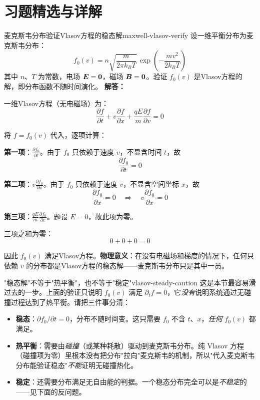 ﻿%

\section*{习题精选与详解}

\begin{example}{麦克斯韦分布验证Vlasov方程的稳态解}{maxwell-vlasov-verify}
设一维平衡分布为麦克斯韦分布：
\[
f_0(v) = n\sqrt{\frac{m}{2\pi k_{\!B}T}}\,\exp\!\left(-\frac{mv^2}{2k_{\!B}T}\right)
\]
其中 $n$、$T$ 为常数，电场 $\bm{E}=\bm{0}$，磁场 $\bm{B}=\bm{0}$。验证 $f_0(v)$ 是Vlasov方程的解，即分布函数不随时间演化。
\tcblower
\textbf{解答：}

一维Vlasov方程（无电磁场）为：
\[
\frac{\partial f}{\partial t} + v\frac{\partial f}{\partial x} + \frac{qE}{m}\frac{\partial f}{\partial v} = 0
\]

将 $f = f_0(v)$ 代入，逐项计算：

\textbf{第一项}：$\frac{\partial f_0}{\partial t}$。由于 $f_0$ 只依赖于速度 $v$，不显含时间 $t$，故
\[
\frac{\partial f_0}{\partial t} = 0
\]

\textbf{第二项}：$v\frac{\partial f_0}{\partial x}$。由于 $f_0$ 只依赖于速度 $v$，不显含空间坐标 $x$，故
\[
\frac{\partial f_0}{\partial x} = 0 \quad\Rightarrow\quad v\frac{\partial f_0}{\partial x} = 0
\]

\textbf{第三项}：$\frac{qE}{m}\frac{\partial f_0}{\partial v}$。题设 $E=0$，故此项为零。

三项之和为零：
\[
0 + 0 + 0 = 0
\]

因此 $f_0(v)$ 满足Vlasov方程。\textbf{物理意义}：在没有电磁场和梯度的情况下，任何只依赖 $v$ 的分布都是Vlasov方程的稳态解——麦克斯韦分布只是其中一员。

\begin{warning}{"稳态解"不等于"热平衡"，也不等于"稳定"}{vlasov-steady-caution}
这是本节最容易滑过去的一步。上面的验证只说明 $f_0(v)$ 满足 $\partial_tf=0$，它\emph{没有}说明系统通过无碰撞过程达到了热平衡。请把三件事分清：
\begin{itemize}
\item \textbf{稳态}：$\partial f_0/\partial t=0$，分布不随时间变。这只需要 $f_0$ 不含 $t$、$x$，\emph{任何} $f_0(v)$ 都满足。
\item \textbf{热平衡}：需要由\emph{碰撞}（或某种耗散）驱动到麦克斯韦分布。纯 Vlasov 方程（碰撞项为零）里根本没有把分布"拉向"麦克斯韦的机制，所以"代入麦克斯韦分布能验证稳态"\emph{不能}证明无碰撞热化。
\item \textbf{稳定}：还需要分布满足无自由能的判据。一个稳态分布完全可以是\emph{不稳定}的——见下面的反问题。
\end{itemize}


\end{warning}
\end{example}
